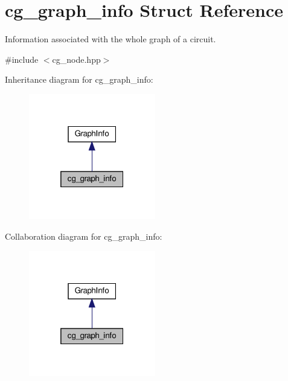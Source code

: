 \hypertarget{structcg__graph__info}{}\section{cg\+\_\+graph\+\_\+info Struct Reference}
\label{structcg__graph__info}


Information associated with the whole graph of a circuit.  




{\ttfamily \#include $<$cg\+\_\+node.\+hpp$>$}



Inheritance diagram for cg\+\_\+graph\+\_\+info\+:
\nopagebreak
\begin{figure}[H]
\begin{center}
\leavevmode
\includegraphics[width=157pt]{d7/db6/structcg__graph__info__inherit__graph}
\end{center}
\end{figure}


Collaboration diagram for cg\+\_\+graph\+\_\+info\+:
\nopagebreak
\begin{figure}[H]
\begin{center}
\leavevmode
\includegraphics[width=157pt]{d2/d8e/structcg__graph__info__coll__graph}
\end{center}
\end{figure}
